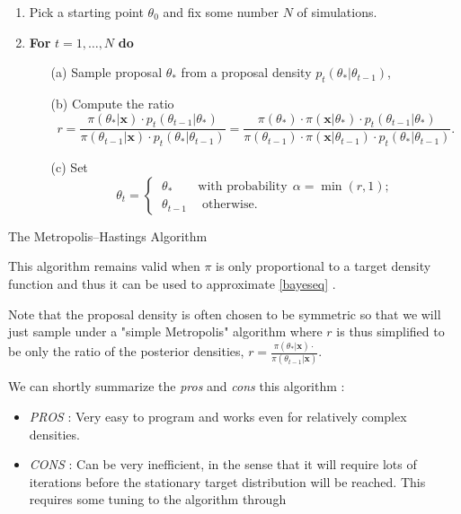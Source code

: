 \begin{algorithm}[H]
	\SetAlgoLined
	\begin{enumerate}
		\item Pick a starting point $\theta_0$ and fix some number $N$ of simulations.
		\item \textbf{For} $t=1,\dots,N$ \quad \textbf{do}
		\begin{itemize}
			\item[(a)] Sample proposal $\theta_*$ from a proposal density $p_t(\theta_*|\theta_{t-1})$,
			\item[(b)] Compute the ratio
			\begin{equation*}
			r = \frac{\pi(\theta_*|\boldsymbol{x})\cdot p_t(\theta_{t-1}|\theta_*)}{\pi(\theta_{t-1}|\boldsymbol{x})\cdot p_t(\theta_*|\theta_{t-1})} = \frac{\pi(\theta_*)\cdot \pi(\boldsymbol{x}|\theta_*)\cdot p_t(\theta_{t-1}|\theta_*)}{\pi(\theta_{t-1})\cdot \pi(\boldsymbol{x}|\theta_{t-1})\cdot p_t(\theta_*|\theta_{t-1})}.
			\end{equation*}
			\item[(c)] Set 
			\begin{equation*}
			\theta_t= 			\begin{cases} \ \theta_* \qquad \text{with probability} \ \  \alpha=\min (r,1); \\
			\ \theta_{t-1} \ \quad \text{otherwise}.
			\end{cases}
			\end{equation*}
		\end{itemize}
	\end{enumerate}
	\caption{The Metropolis–Hastings Algorithm}
\end{algorithm}


This algorithm remains valid when $\pi$ is only proportional to a target density function and thus it can be used to approximate \ref{bayeseq} . 

Note that the proposal density is often chosen to be symmetric so that we will just sample under a "simple Metropolis" algorithm where $r$ is thus simplified to be only the ratio of the posterior densities, $r=\frac{\pi(\theta_*|\boldsymbol{x})\cdot }{\pi(\theta_{t-1}|\boldsymbol{x})}$.

We can shortly summarize the \emph{pros} and \emph{cons} this algorithm :

\begin{itemize}
	\item \emph{PROS} : Very easy to program and works even for relatively complex densities.
	\item \emph{CONS} : Can be very inefficient, in the sense that it will require lots of iterations before the stationary target distribution will be reached. This requires some tuning to the algorithm through 
\end{itemize}



